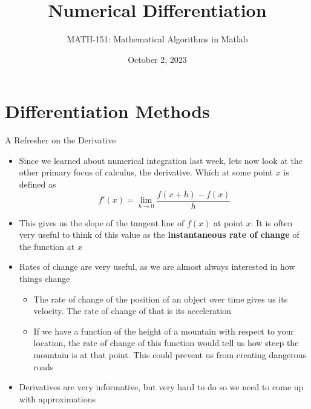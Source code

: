 {}\documentclass[letterpaper,
compress,
xcolor=x11names,
]{beamer}
\begin{document}
	\title{Numerical Differentiation}
	\author{MATH-151:  Mathematical Algorithms in Matlab}
	\date[202X]{October 2, 2023}




\begin{frame}
\titlepage
\end{frame}


\section{Differentiation Methods}

\begin{frame}{A Refresher on the Derivative}
	\footnotesize
	\begin{itemize}
		\item Since we learned about numerical integration last week, lets now look at the other primary focus of calculus, the derivative. Which at some point $x$ is defined as 
		\begin{equation*}
			\displaystyle f'(x) = \lim_{h\rightarrow 0}\frac{f(x+h) - f(x)}{h}
		\end{equation*}
		\item<2-> This gives us the slope of the tangent line of $f(x)$ at point $x$. It is often very useful to think of this value as the \textbf{instantaneous rate of change} of the function at $x$
		\item<3-> Rates of change are very useful, as we are almost always interested in how things change
		\begin{itemize}
			\item The rate of change of the position of an object over time gives us its velocity. The rate of change of that is its acceleration
			\item If we have a function of the height of a mountain with respect to your location, the rate of change of this function would tell us how steep the mountain is at that point. This could prevent us from creating dangerous roads
		\end{itemize}
		\item<4-> Derivatives are very informative, but very hard to do so we need to come up with approximations
	\end{itemize}
\end{frame}
\end{document}
